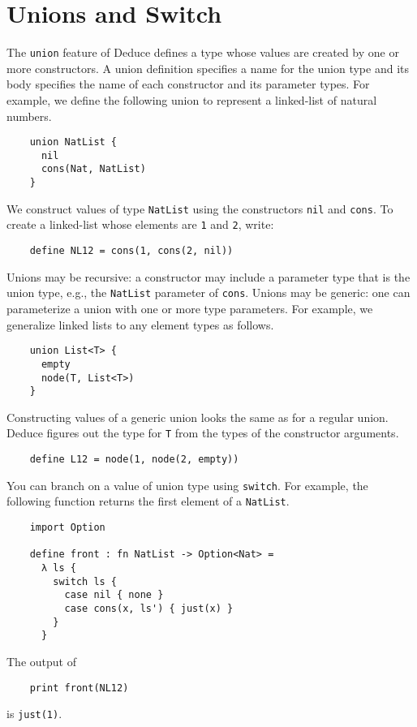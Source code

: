 \documentclass[12pt]{article}
\begin{document}
\section{Unions and Switch}
\label{sec:union}

The \texttt{union} feature of Deduce defines a type whose values are
created by one or more constructors.  A union definition specifies a
name for the union type and its body specifies the name of each
constructor and its parameter types. For example, we define the
following union to represent a linked-list of natural numbers.

\begin{verbatim}
    union NatList {
      nil
      cons(Nat, NatList)
    }
\end{verbatim}

We construct values of type \texttt{NatList} using the constructors
\texttt{nil} and \texttt{cons}. To create a linked-list whose elements
are \texttt{1} and \texttt{2}, write:

\begin{verbatim}
    define NL12 = cons(1, cons(2, nil))
\end{verbatim}

Unions may be recursive: a constructor may include a parameter type
that is the union type, e.g., the \texttt{NatList} parameter of
\texttt{cons}. Unions may be generic: one can parameterize a union
with one or more type parameters. For example, we generalize linked
lists to any element types as follows.

\begin{verbatim}
    union List<T> {
      empty
      node(T, List<T>)
    }
\end{verbatim}

Constructing values of a generic union looks the same as for a regular
union. Deduce figures out the type for \texttt{T} from the types of
the constructor arguments.

\begin{verbatim}
    define L12 = node(1, node(2, empty))
\end{verbatim}

\pagebreak

You can branch on a value of union type using \texttt{switch}. For
example, the following function returns the first element of a
\texttt{NatList}.

\begin{verbatim}
    import Option

    define front : fn NatList -> Option<Nat> =
      λ ls { 
        switch ls {
          case nil { none }
          case cons(x, ls') { just(x) }
        }
      }
\end{verbatim}
\noindent The output of 
\begin{verbatim}
    print front(NL12)
\end{verbatim}
\noindent is \texttt{just(1)}.
\end{document}
